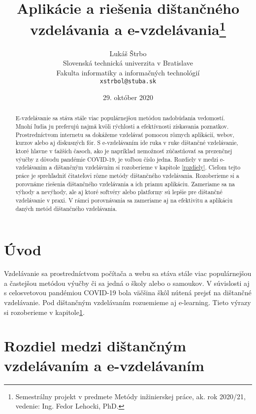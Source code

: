 \documentclass[10pt,oneside,slovak,a4paper]{article}
\title{Aplikácie a riešenia dištančného vzdelávania a e-vzdelávania\thanks{Semestrálny projekt v predmete Metódy inžinierskej práce, ak. rok 2020/21, vedenie: Ing. Fedor Lehocki, PhD.}}
\author{Lukáš Štrbo\\[2pt]
	{\small Slovenská technická univerzita v Bratislave}\\
	{\small Fakulta informatiky a informačných technológií}\\
	{\small \texttt{xstrbol@stuba.sk}}
	}
\date{\small 29. október 2020}
\begin{document}
\maketitle

\begin{abstract}
E-vzdelávanie sa stáva stále viac populárnejšou metódou nadobúdania vedomostí. Mnohí ľudia ju preferujú najmä kvôli rýchlosti a efektívnosti získavania poznatkov.
Prostredníctvom internetu sa dokážeme vzdelávať pomocou rôznych aplikácií, webov, kurzov alebo aj diskusných fór.
S e-vzdelávaním ide ruka v ruke dištančné vzdelávanie, ktoré hlavne v ťažších časoch, ako je napríklad nemožnosť zúčastňovať sa prezenčnej výučby z dôvodu pandémie COVID-19, 
 je voľbou číslo jedna. Rozdiely v medzi e-vzdelávaním a dištančným vzdelávním si rozoberieme v kapitole \ref{rozdiely}. Cieľom tejto práce je sprehľadniť čitateľovi rôzne metódy dištančného vzdelávania. Rozoberieme si a porovnáme riešenia dištančného vzdelávania a ich priamu
 aplikáciu. Zameriame sa na výhody a nevýhody, ale aj ktoré softvéry alebo platformy sú lepšie pre dištančné vzdelávanie v praxi. 
 V rámci porovnávania sa zameriame aj na efektivitu a aplikáciu daných metód dištančného vzdelávania.
\end{abstract}



\section*{Úvod} %
\label{uvod}
Vzdelávanie sa prostredníctvom počítača a webu sa stáva stále viac populárnejšou a častejšou metódou výučby či sa jedná o školy alebo o samoukov. V súvislosti aj s celosvetovou pandémiou 
 COVID-19 bola väčšina škôl nútená prejsť na dištančné vzdelávanie. Pod dištančným vzdelávaním rozuemieme aj e-learning. Tieto výrazy si rozoberieme v kapitole\ref{rozdiely}.  

\section{Rozdiel medzi dištančným vzdelávaním a e-vzdelávaním}
\label{rozdiely}
\end{document}
